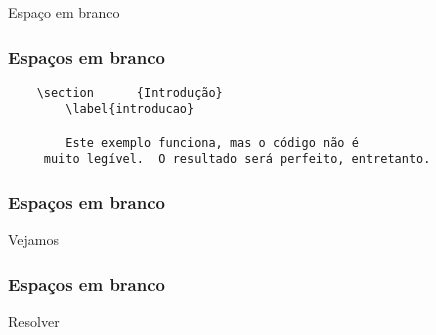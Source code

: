 \begin{frame}[standout]
  \Huge
  Espaço em branco
\end{frame}

\begin{frame}[fragile]
  \frametitle{Espaços em branco}
  \begin{verbatim}
    \section      {Introdução}
        \label{introducao}

        Este exemplo funciona, mas o código não é
     muito legível.  O resultado será perfeito, entretanto.
  \end{verbatim}
\end{frame}

\begin{frame}
  \frametitle{Espaços em branco}
  \huge
  Vejamos 
\end{frame}

\begin{frame}
  \frametitle{Espaços em branco}
  \huge
  Resolver 
\end{frame}
